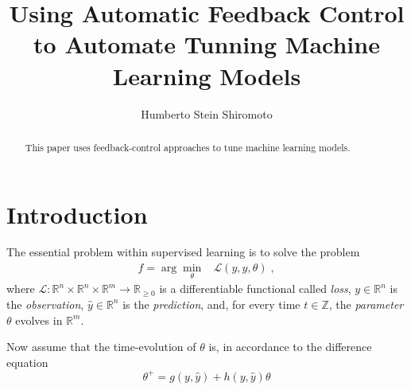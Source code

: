 \documentclass{tufte-handout}
\title{Using Automatic Feedback Control to Automate Tunning Machine Learning Models}
\author[H. Stein Shiromoto]{Humberto Stein Shiromoto}
\begin{document}
\maketitle%

\begin{abstract}
\noindent
This paper uses feedback-control approaches to tune machine learning models.
\end{abstract}


\section{Introduction}

The essential problem within supervised learning is to solve the problem
\begin{eqnarray}
  f=\arg\min_\theta&\mathcal{L}(y,\hat{y},\theta)\;,
\end{eqnarray}
where $\mathcal{L}:\mathbb{R}^n\times\mathbb{R}^n\times\mathbb{R}^m\to\mathbb{R}_{\geq0}$ is a differentiable functional called \emph{loss}, $y\in\mathbb{R}^n$ is the \emph{observation}, $\hat{y}\in\mathbb{R}^n$ is the \emph{prediction}, and, for every time $t\in\mathbb{Z}$, the \emph{parameter} $\theta$ evolves in $\mathbb{R}^m$.

Now assume that the time-evolution of $\theta$ is, in accordance to the difference equation
\begin{equation}
\theta^+=g(y,\hat{y})+h(y,\hat{y})\theta
\end{equation}
\end{document}
